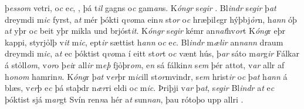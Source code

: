 þ\textit{ess}\textit{om} vetri, o\textit{c} 
 e\textit{c},  
,   þá t\textit{il} gagns o\textit{c} gam\textit{an}s. K\textit{óngr}
s\textit{egir} .  Bl\textit{indr} s\textit{egir} þ\textit{at} dreymdi
m\textit{ic} fyrst, a\textit{t} mér þókti q\textit{vo}ma ein\textit{n} st\textit{or} o\textit{c} hræþil\textit{e}gr hýþbj\textit{ỏr}n,
h\textit{ann} óþ a\textit{t} yþr o\textit{c} beit yþr mikla  und   brjóst\textit{it}. 
K\textit{óngr} s\textit{egir}  kémr an\textit{n}\textit{at}hv\textit{or}t K\textit{óng}r eþr   kappi,   styrjỏlþ v\textit{it} m\textit{ic},   ept\textit{ir} sættist  h\textit{ann} o\textit{c} e\textit{c}.
Bl\textit{indr} m\textit{ælir} an\textit{n}\textit{an}\textit{n} draum
dreymdi m\textit{ic},   a\textit{t} ec  þóktist q\textit{vo}ma í eitt st\textit{or}t
o\textit{c} vænt hús, þ\textit{ar} sáto m\textit{ar}g\textit{ir} Fálkar á stỏll\textit{om}, v\textit{or}o þ\textit{ei}r all\textit{ir}
m\textit{eþ}  fjỏþr\textit{om}, e\textit{n} sá fálkin\textit{n} s\textit{em} þér attot,   v\textit{ar}  allr   af h\textit{onom} hamrin\textit{n}. 
K\textit{óng}r   þ\textit{at} v\textit{er}þr m\textit{ic}ill st\textit{or}mvindr,
s\textit{em} hrist\textit{ir} o\textit{c}  þ\textit{at} h\textit{ann} á blæs, v\textit{er}þ e\textit{c} þá staþdr
n\textit{ær}ri eldi o\textit{c}     m\textit{ic}. 
Þriþji   v\textit{ar} þ\textit{at}, s\textit{egir} Bl\textit{indr} a\textit{t} e\textit{c} þóktist sjá m\textit{ar}gt Svín
ren\textit{n}a hér a\textit{t} sun\textit{n}\textit{an}, þau rótoþo upp allri   . 
